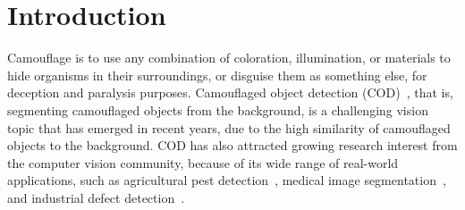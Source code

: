 \documentclass{ecai}
\begin{document}
\begin{frontmatter}
\begin{abstract}
\end{abstract}

\end{frontmatter}



\section{Introduction}
Camouflage is to use any combination of coloration, illumination, or materials to hide organisms in their surroundings, or disguise them as something else, for deception and paralysis purposes. Camouflaged object detection (COD)~\cite{fan2020camouflaged}, that is, segmenting camouflaged objects from the background, is a challenging vision topic that has emerged in recent years, due to the high similarity of camouflaged objects to the background. COD has also attracted growing research interest from the computer vision community, because of its wide range of real-world applications, such as agricultural pest detection~\cite{kumar2021early}, medical image segmentation~\cite{li2022trichomonas}, and industrial defect detection~\cite{tabernik2020segmentation}. 

\end{document}
